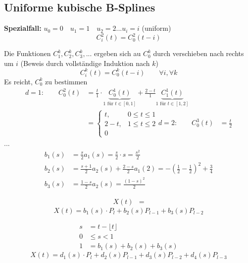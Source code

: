 \subsection{Uniforme kubische B-Splines}
\textbf{Spezialfall:} $u_0 = 0 \quad u_1 = 1 \quad u_2 = 2 ... u_i = i$ (uniform)
\[C^2_i(t) = C^2_0(t-i)\]
\begin{center}
\end{center}
Die Funktionen $C_1^k, C_2^k, C_3^k, ...$ ergeben sich au $C_0^k$ durch verschieben nach rechts um $i$
(Beweis durch vollständige Induktion nach $k$)
\[\boxed{C_i^k(t) = C_0^k(t-i) \qquad \forall i, \forall k}\]
Es reicht, $C_0^k$ zu bestimmen
\begin{align*}
 d=1{:}\qquad C_0^2(t) &= \frac{t}{1} \cdot \underbrace{C_0^1(t)}_{1 \text{ für } t \in [0,1]} +
				\frac{2-t}{1} \underbrace{C_1^1(t)}_{1 \text{ für } t \in [1,2]}\\
		&= \begin{cases}
		    t, & 0 \le t \le 1\\
		    2-t, & 1 \le t \le 2\\
		    0
		   \end{cases}	%
 d=2{:}\qquad C_0^3(t) &= \frac{t}{2} %
\end{align*}
...
\begin{align*}
 b_1(s) &= \frac{s}{2} a_1(s) = \frac{s}{2} \cdot s = \frac{s^2}{2}\\
 b_2(s) &= \frac{s+1}{2} a_2(s) + \frac{2-s}{2} a_1(2) = -\left(\frac{1}{2} - \frac{1}{2}\right)^2 + \frac{3}{4}\\
 b_3(s) &= \frac{1-s}{2} a_2(s) = \frac{(1-s)^2}{2}
\end{align*}
\begin{center}
\end{center}
\begin{align*}
 X(t) &= %
\end{align*}
\[X(t) = b_1(s) \cdot P_l + b_2(s) P_{l-1} + b_3(s) P_{l-2}\]
\begin{center}
\end{center}
\begin{align*}
 s &= t - \lfloor t \rfloor\\
 0 &\le s < 1\\
 1 &= b_1(s) + b_2(s) + b_3(s)
\end{align*}
\[X(t) = d_1(s) \cdot P_l + d_2(s) P_{l-1} + d_3(s) P_{l-2} + d_4(s) P_{l-3}\]
\begin{center}
\end{center}
